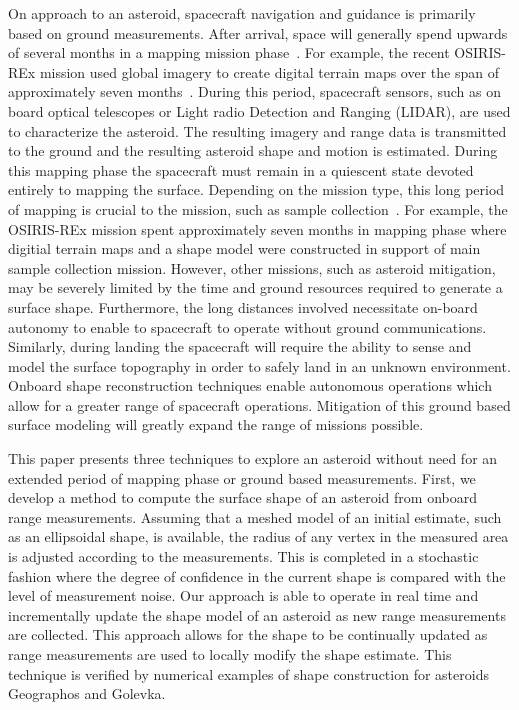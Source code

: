 \documentclass[smallextended]{svjour3}       %
\begin{document}
On approach to an asteroid, spacecraft navigation and guidance is primarily based on ground measurements.
After arrival, space will generally spend upwards of several months in a mapping mission phase~\cite{williams2018,kubota2003,cole1998}.
For example, the recent OSIRIS-REx mission used global imagery to create digital terrain maps over the span of approximately seven months~\cite{williams2018}.
During this period, spacecraft sensors, such as on board optical telescopes or Light radio Detection and Ranging (LIDAR), are used to characterize the asteroid.
The resulting imagery and range data is transmitted to the ground and the resulting asteroid shape and motion is estimated. 
During this mapping phase the spacecraft must remain in a quiescent state devoted entirely to mapping the surface.
Depending on the mission type, this long period of mapping is crucial to the mission, such as sample collection~\cite{williams2018}. 
For example, the OSIRIS-REx mission spent approximately seven months in mapping phase where digitial terrain maps and a shape model were constructed in support of main sample collection mission.
However, other missions, such as asteroid mitigation, may be severely limited by the time and ground resources required to generate a surface shape.
Furthermore, the long distances involved necessitate on-board autonomy to enable to spacecraft to operate without ground communications.
Similarly, during landing the spacecraft will require the ability to sense and model the surface topography in order to safely land in an unknown environment.
Onboard shape reconstruction techniques enable autonomous operations which allow for a greater range of spacecraft operations.
Mitigation of this ground based surface modeling will greatly expand the range of missions possible.

This paper presents three techniques to explore an asteroid without need for an extended period of mapping phase or ground based measurements. 
First, we develop a method to compute the surface shape of an asteroid from onboard range measurements.
Assuming that a meshed model of an initial estimate, such as an ellipsoidal shape, is available, the radius of any vertex in the measured area is adjusted according to the measurements. 
This is completed in a stochastic fashion where the degree of confidence in the current shape is compared with the level of measurement noise. 
Our approach is able to operate in real time and incrementally update the shape model of an asteroid as new range measurements are collected.
This approach allows for the shape to be continually updated as range measurements are used to locally modify the shape estimate.
This technique is verified by numerical examples of shape construction for asteroids Geographos and Golevka. 
\end{document}
